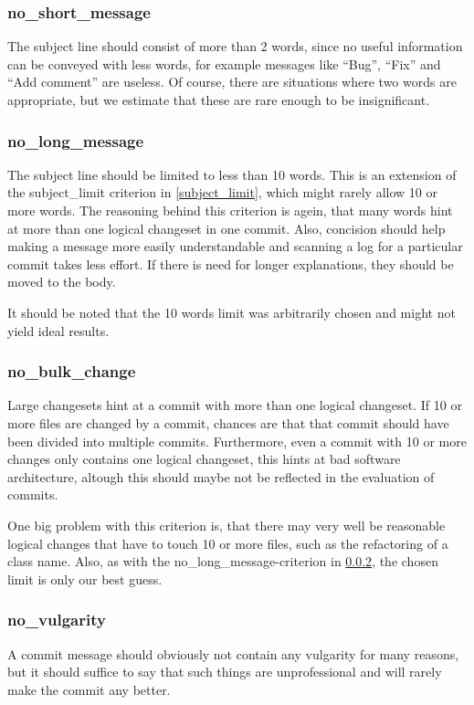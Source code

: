 \subsubsection{no\_short\_message}
\label{subs:no_short_message}
The subject line should consist of more than 2 words, since no useful information can be conveyed with less words, for example messages like ``Bug'', ``Fix'' and ``Add comment'' are useless. Of course, there are situations where two words are appropriate, but we estimate that these are rare enough to be insignificant.

\subsubsection{no\_long\_message}
\label{subs:no_long_message}
The subject line should be limited to less than 10 words. This is an extension of the subject\_limit criterion in \ref{subject_limit}, which might rarely allow 10 or more words. The reasoning behind this criterion is agein, that many words hint at more than one logical changeset in one commit. Also, concision should help making a message more easily understandable and scanning a log for a particular commit takes less effort. If there is need for longer explanations, they should be moved to the body.

It should be noted that the 10 words limit was arbitrarily chosen and might not yield ideal results.

\subsubsection{no\_bulk\_change}
\label{subs:no_bulk_change}
Large changesets hint at a commit with more than one logical changeset. If 10 or more files are changed by a commit, chances are that that commit should have been divided into multiple commits. Furthermore, even a commit with 10 or more changes only contains one logical changeset, this hints at bad software architecture, altough this should maybe not be reflected in the evaluation of commits.

One big problem with this criterion is, that there may very well be reasonable logical changes that have to touch 10 or more files, such as the refactoring of a class name. Also, as with the no\_long\_message-criterion in \ref{subs:no_long_message}, the chosen limit is only our best guess.

\subsubsection{no\_vulgarity}
\label{subs:no_vulgarity}
A commit message should obviously not contain any vulgarity for many reasons, but it should suffice to say that such things are unprofessional and will rarely make the commit any better.

